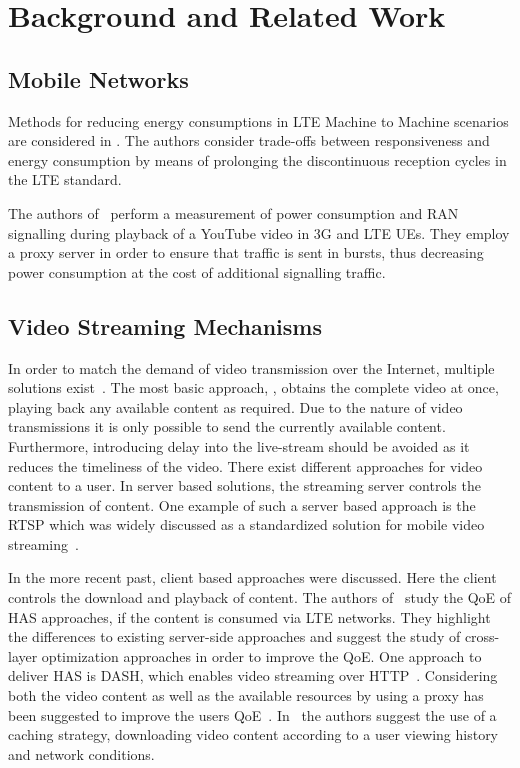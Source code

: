 \section{Background and Related Work}\label{sec:application:background}

\subsection{Mobile Networks}

Methods for reducing energy consumptions in \gls{LTE} Machine to Machine scenarios are considered in \cite{Tirronen2012}.
The authors consider trade-offs between responsiveness and energy consumption by means of prolonging the discontinuous reception cycles in the \gls{LTE} standard.

The authors of~\cite{Siekkinen2013} perform a measurement of power consumption and \gls{RAN} signalling during playback of a YouTube video in \gls{3G} and \gls{LTE} \glspl{UE}.
They employ a proxy server in order to ensure that traffic is sent in bursts, thus decreasing power consumption at the cost of additional signalling traffic.

\subsection{Video Streaming Mechanisms}\label{sec:application:background:video_streaming_mechanisms}

In order to match the demand of video transmission over the Internet, multiple solutions exist~\cite{Begen2011}.
The most basic approach, \download, obtains the complete video at once, playing back any available content as required.
Due to the nature of \live video transmissions it is only possible to send the currently available content.
Furthermore, introducing delay into the live-stream should be avoided as it reduces the timeliness of the video.
There exist different approaches for \streaming video content to a user.
In server based solutions, the streaming server controls the transmission of content.
One example of such a server based approach is the \gls{RTSP} which was widely discussed as a standardized solution for mobile video streaming~\cite{Elsen2001}.

In the more recent past, client based approaches were discussed.
Here the client controls the download and playback of content.
The authors of~\cite{Oyman2012} study the \gls{QoE} of \gls{HAS} approaches, if the content is consumed via \gls{LTE} networks.
They highlight the differences to existing server-side approaches and suggest the study of cross-layer optimization approaches in order to improve the \gls{QoE}.
One approach to deliver \gls{HAS} is \gls{DASH}, which enables video streaming over \gls{HTTP}~\cite{Sodagar2011}.
Considering both the video content as well as the available resources by using a proxy has been suggested to improve the users \gls{QoE}~\cite{Essaili2013}.
In~\cite{Xin2012} the authors suggest the use of a caching strategy, downloading video content according to a user viewing history and network conditions.

